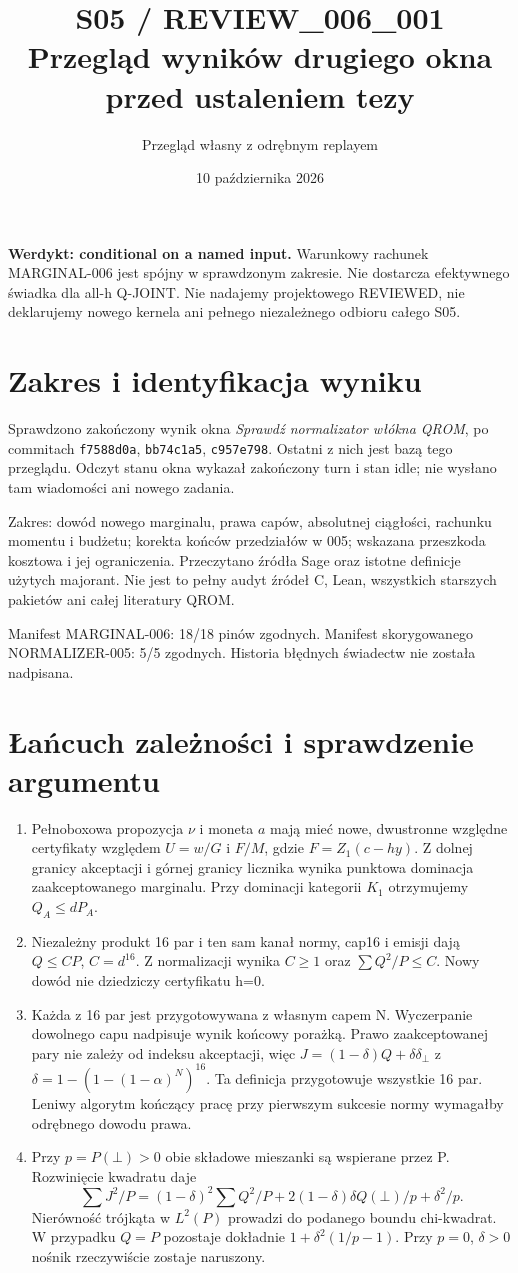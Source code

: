 \documentclass[11pt,a4paper]{article}
\title{S05 / REVIEW\_006\_001\\\large Przegląd wyników drugiego okna przed ustaleniem tezy}
\author{Przegląd własny z odrębnym replayem}\date{10 października 2026}
\newcommand{\code}[1]{\nolinkurl{#1}}
\begin{document}
\maketitle
\textbf{Werdykt: conditional on a named input.}
Warunkowy rachunek MARGINAL-006 jest spójny w sprawdzonym zakresie.
Nie dostarcza efektywnego świadka dla all-h Q-JOINT.
Nie nadajemy projektowego REVIEWED, nie deklarujemy nowego kernela
ani pełnego niezależnego odbioru całego S05.

\section{Zakres i identyfikacja wyniku}
Sprawdzono zakończony wynik okna \emph{Sprawdź normalizator włókna QROM},
po commitach \code{f7588d0a}, \code{bb74c1a5}, \code{c957e798}.
Ostatni z nich jest bazą tego przeglądu. Odczyt stanu okna wykazał
zakończony turn i stan idle; nie wysłano tam wiadomości ani nowego zadania.

Zakres: dowód nowego marginalu, prawa capów, absolutnej ciągłości,
rachunku momentu i budżetu; korekta końców przedziałów w 005; wskazana
przeszkoda kosztowa i jej ograniczenia. Przeczytano źródła Sage oraz
istotne definicje użytych majorant. Nie jest to pełny audyt źródeł C,
Lean, wszystkich starszych pakietów ani całej literatury QROM.

Manifest MARGINAL-006: 18/18 pinów zgodnych.
Manifest skorygowanego NORMALIZER-005: 5/5 zgodnych.
Historia błędnych świadectw nie została nadpisana.

\section{Łańcuch zależności i sprawdzenie argumentu}
\begin{enumerate}
\item Pełnoboxowa propozycja $\nu$ i moneta $a$ mają mieć nowe, dwustronne
względne certyfikaty względem $U=w/G$ i $F/M$, gdzie $F=Z_1(c-hy)$.
Z dolnej granicy akceptacji i górnej granicy licznika wynika punktowa
dominacja zaakceptowanego marginalu. Przy dominacji kategorii $K_1$
otrzymujemy $Q_A\le dP_A$.
\item Niezależny produkt 16 par i ten sam kanał normy, cap16 i emisji
dają $Q\le CP$, $C=d^{16}$. Z normalizacji wynika $C\ge1$ oraz
$\sum Q^2/P\le C$. Nowy dowód nie dziedziczy certyfikatu h=0.
\item Każda z 16 par jest przygotowywana z własnym capem N.
Wyczerpanie dowolnego capu nadpisuje wynik końcowy porażką.
Prawo zaakceptowanej pary nie zależy od indeksu akceptacji, więc
$J=(1-\delta)Q+\delta\delta_\bot$ z
$\delta=1-(1-(1-\alpha)^N)^{16}$.
Ta definicja przygotowuje wszystkie 16 par. Leniwy algorytm kończący
pracę przy pierwszym sukcesie normy wymagałby odrębnego dowodu prawa.
\item Przy $p=P(\bot)>0$ obie składowe mieszanki są wspierane przez P.
Rozwinięcie kwadratu daje
\[
 \sum J^2/P=(1-\delta)^2\sum Q^2/P
  +2(1-\delta)\delta Q(\bot)/p+\delta^2/p.
\]
Nierówność trójkąta w $L^2(P)$ prowadzi do podanego boundu chi-kwadrat.
W przypadku $Q=P$ pozostaje dokładnie $1+\delta^2(1/p-1)$.
Przy $p=0$, $\delta>0$ nośnik rzeczywiście zostaje naruszony.
\end{enumerate}
\end{document}
